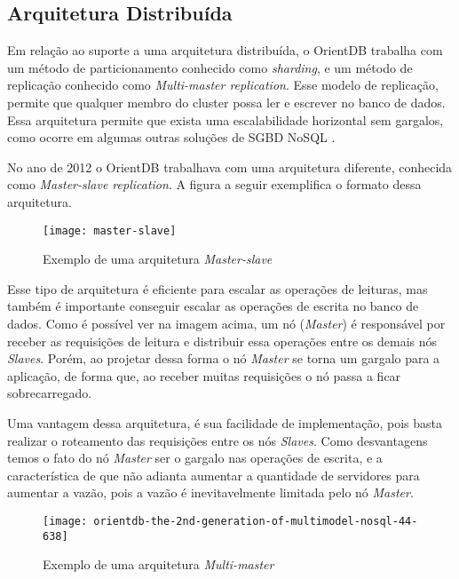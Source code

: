 \subsection{Arquitetura Distribuída}
	Em relação ao suporte a uma arquitetura distribuída, o OrientDB trabalha com um método de particionamento conhecido como \textit{sharding}, e um método de replicação conhecido como \textit{Multi-master replication}. Esse modelo de replicação, permite que qualquer membro do cluster possa ler e escrever no banco de dados. Essa arquitetura permite que exista uma escalabilidade horizontal sem gargalos, como ocorre em algumas outras soluções de SGBD NoSQL \cite{kauremerging}.
	
	No ano de 2012 o OrientDB trabalhava com uma arquitetura diferente, conhecida como \textit{Master-slave replication}. A figura a seguir exemplifica o formato dessa arquitetura.
	
\begin{figure}[h]
	\centering
    \texttt{[image: master-slave]}
    \caption{Exemplo de uma arquitetura \textit{Master-slave}}
    \label{fig:master-slave}
\end{figure}

	Esse tipo de arquitetura é eficiente para escalar as operações de leituras, mas também é importante conseguir escalar as operações de escrita no banco de dados. Como é possível ver na imagem acima, um nó (\textit{Master}) é responsável por receber as requisições de leitura e distribuir essa operações entre os demais nós \textit{Slaves}. Porém, ao projetar dessa forma o nó \textit{Master} se torna um gargalo para a aplicação, de forma que, ao receber muitas requisições o nó passa a ficar sobrecarregado.
	
	Uma vantagem dessa arquitetura, é sua facilidade de implementação, pois basta realizar o roteamento das requisições entre os nós \textit{Slaves}. Como desvantagens temos o fato do nó \textit{Master} ser o gargalo nas operações de escrita, e a característica de que não adianta aumentar a quantidade de servidores para aumentar a vazão, pois a vazão é inevitavelmente limitada pelo nó \textit{Master}.
	
\begin{figure}[h]
	\centering
    \texttt{[image: orientdb-the-2nd-generation-of-multimodel-nosql-44-638]}
    \caption{Exemplo de uma arquitetura \textit{Multi-master}}
    \label{fig:multi-master}
\end{figure}
	
